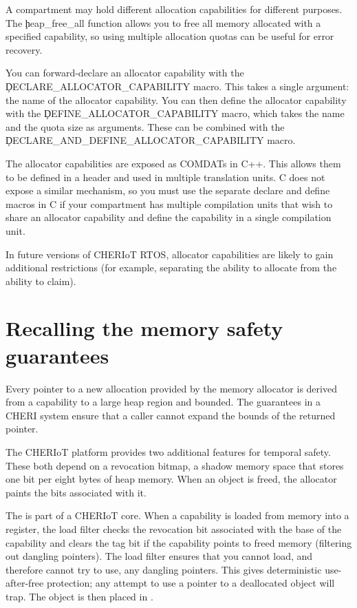A compartment may hold different allocation capabilities for different purposes.
The \c{heap_free_all} function allows you to free all memory allocated with a specified capability, so using multiple allocation quotas can be useful for error recovery.

You can forward-declare an allocator capability with the \c{DECLARE_ALLOCATOR_CAPABILITY} macro.
This takes a single argument: the name of the allocator capability.
You can then define the allocator capability with the \c{DEFINE_ALLOCATOR_CAPABILITY} macro, which takes the name and the quota size as arguments.
These can be combined with the \c{DECLARE_AND_DEFINE_ALLOCATOR_CAPABILITY} macro.

\begin{caution}
The allocator capabilities are exposed as COMDATs in C++.
This allows them to be defined in a header and used in multiple translation units.
C does not expose a similar mechanism, so you must use the separate declare and define macros in C if your compartment has multiple compilation units that wish to share an allocator capability and define the capability in a single compilation unit.
\end{caution}

In future versions of CHERIoT RTOS, allocator capabilities are likely to gain additional restrictions (for example, separating the ability to allocate from the ability to claim).

\section{Recalling the memory safety guarantees}

Every pointer to a new allocation provided by the memory allocator is derived from a capability to a large heap region and bounded.
The  guarantees in a CHERI system ensure that a caller cannot expand the bounds of the returned pointer.

The CHERIoT platform provides two additional features for temporal safety.
These both depend on a revocation bitmap, a shadow memory space that stores one bit per eight bytes of heap memory.
When an object is freed, the allocator paints the bits associated with it.

The  is part of a CHERIoT core.
When a capability is loaded from memory into a register, the load filter checks the revocation bit associated with the base of the capability and clears the tag bit if the capability points to freed memory (filtering out dangling pointers).
The load filter ensures that you cannot load, and therefore cannot try to use, any dangling pointers.
This gives deterministic use-after-free protection; any attempt to use a pointer to a deallocated object will trap.
The object is then placed in .

